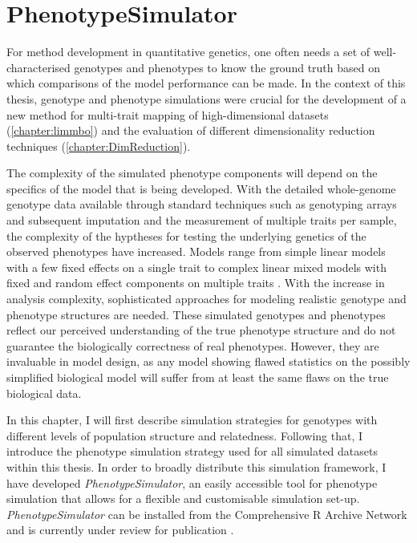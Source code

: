 \chapter{PhenotypeSimulator}
\label{chapter:simulation} 
For method development in quantitative genetics, one often needs a set of well-characterised genotypes and phenotypes to know the ground truth based on which comparisons of the model performance can be made. In the context of this thesis, genotype and phenotype simulations were crucial for the development of a new method for multi-trait mapping of high-dimensional datasets (\cref{chapter:limmbo}) and the evaluation of different dimensionality reduction techniques (\cref{chapter:DimReduction}).

The complexity of the simulated phenotype components will depend on the specifics of the model that is being developed. With the detailed whole-genome genotype data available through standard techniques such as genotyping arrays and subsequent imputation and the measurement of multiple traits per sample, the complexity of the hyptheses for testing the underlying genetics of the observed phenotypes have increased. Models range from simple linear models with a few fixed effects on a single trait to complex linear mixed models with fixed and random effect components on multiple traits \citep{Stephens2013,Marigorta2014,Zhou2014,Loh2014}. With the increase in analysis complexity, sophisticated approaches for modeling realistic genotype and phenotype structures are needed. These simulated genotypes and phenotypes reflect our perceived understanding of the true phenotype structure and do not guarantee the biologically correctness of real phenotypes. However, they are invaluable in model design, as any model showing flawed statistics on the possibly simplified biological model will suffer from at least the same flaws on the true biological data.

In this chapter, I will first describe simulation strategies for genotypes with different levels of population structure and relatedness. Following that, I introduce the phenotype simulation strategy used for all simulated datasets within this thesis. In order to broadly distribute this simulation framework, I have developed \textit{PhenotypeSimulator}, an easily accessible tool for phenotype simulation that allows for a flexible and customisable simulation set-up. \textit{PhenotypeSimulator} can be installed from the Comprehensive R Archive Network \citep{Meyer2017b} and is currently under review for publication \citep{Meyer2017a}.

